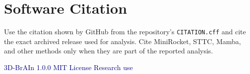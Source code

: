 \documentclass[11pt,a4paper]{article}
\newcommand{\code}[1]{\texttt{#1}}
\begin{document}
\section*{Software Citation}

Use the citation shown by GitHub from the repository's \code{CITATION.cff} and
cite the exact archived release used for analysis. Cite MiniRocket, STTC, Mamba,
and other methods only when they are part of the reported analysis.

\vfill
\begin{center}
\small\textcolor{Navy}{3D-BrAIn 1.0.0 \textbullet{} MIT License \textbullet{} Research use}
\end{center}
\end{document}
